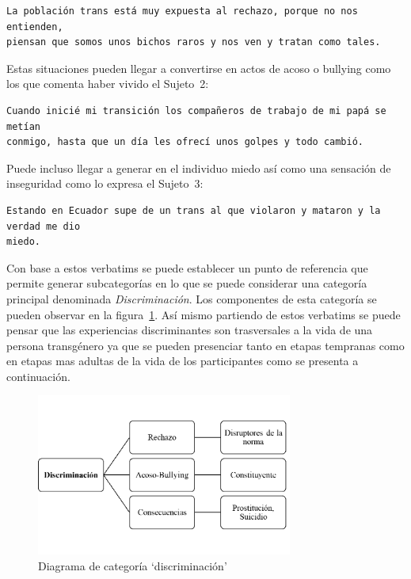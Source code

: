 \begin{verbatim}
La población trans está muy expuesta al rechazo, porque no nos entienden,
piensan que somos unos bichos raros y nos ven y tratan como tales.
\end{verbatim}

Estas situaciones pueden llegar a convertirse en actos de acoso o bullying como
los que comenta haber vivido el Sujeto~2:

\begin{verbatim}
Cuando inicié mi transición los compañeros de trabajo de mi papá se metían
conmigo, hasta que un día les ofrecí unos golpes y todo cambió.
\end{verbatim}

 Puede incluso llegar a generar en el individuo miedo así como una sensación de
 inseguridad como lo expresa el Sujeto~3:

 \begin{verbatim}
Estando en Ecuador supe de un trans al que violaron y mataron y la verdad me dio
miedo.
 \end{verbatim}

Con base a estos verbatims se puede establecer un punto de referencia que
permite generar subcategorías en lo que se puede considerar una categoría
principal denominada \emph{Discriminación}. Los componentes de esta categoría se
pueden observar en la figura~\ref{fig:discriminacion}. Así mismo partiendo de
estos verbatims se puede pensar que las experiencias discriminantes son
trasversales a la vida de una persona transgénero ya que se pueden presenciar
tanto en etapas tempranas como en etapas mas adultas de la vida de los
participantes como se presenta a continuación.

\begin{figure}
    \centering
    \includegraphics[width=0.75\textwidth]{discriminacion}
    \caption{Diagrama de categoría ‘discriminación’}\label{fig:discriminacion}
\end{figure}

